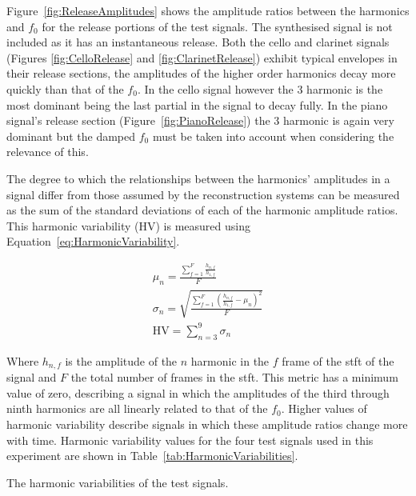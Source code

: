 		Figure~\ref{fig:ReleaseAmplitudes} shows the amplitude ratios between the harmonics and $f_{0}$ for the
		release portions of the test signals. The synthesised signal is not included as it has an instantaneous
		release. Both the cello and clarinet signals (Figures \ref{fig:CelloRelease} and \ref{fig:ClarinetRelease})
		exhibit typical envelopes in their release sections, the amplitudes of the higher order harmonics decay
		more quickly than that of the $f_{0}$. In the cello signal however the 3 harmonic is the most
		dominant being the last partial in the signal to decay fully. In the piano signal's release section
		(Figure~\ref{fig:PianoRelease}) the 3 harmonic is again very dominant but the damped $f_{0}$ must
		be taken into account when considering the relevance of this.

		The degree to which the relationships between the harmonics' amplitudes in a signal differ from those
		assumed by the reconstruction systems can be measured as the sum of the standard deviations of each of the
		harmonic amplitude ratios. This harmonic variability ($\mathrm{HV}$) is measured using
		Equation~\ref{eq:HarmonicVariability}. 		
		
		\begin{gather}
			\mu_{n} = \frac{\sum_{f = 1}^{F} \frac{h_{n,f}}{h_{1,f}}}{F} \nonumber \\
			\sigma_{n} = \sqrt{\frac{\sum_{f = 1}^{F} 
					         \left(\frac{h_{n,f}}{h_{1,f}} - \mu_{n} \right)^{2}}{F}} \nonumber \\
			\mathrm{HV} = \sum_{n = 3}^{9} \sigma_{n}
			\label{eq:HarmonicVariability}
		\end{gather}

		Where $h_{n,f}$ is the amplitude of the $n$ harmonic in the $f$ frame of the
		\acrshort{stft} of the signal and $F$ the total number of frames in the \acrshort{stft}. This metric has a
		minimum value of zero, describing a signal in which the amplitudes of the third through ninth harmonics are
		all linearly related to that of the $f_{0}$. Higher values of harmonic variability describe signals in
		which these amplitude ratios change more with time. Harmonic variability values for the four test signals
		used in this experiment are shown in Table~\ref{tab:HarmonicVariabilities}.

		\begin{table}[h!]
			\centering
			
			\caption{The harmonic variabilities of the test signals.}
			\label{tab:HarmonicVariabilities}
		\end{table}

